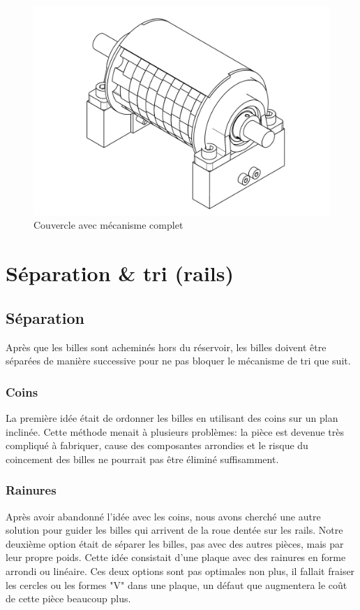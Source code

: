 \begin{figure}
    \centering
    \includegraphics[width=\textwidth]{Graphics/Roue/DRAWING_COUVERCLE_COMPLET.pdf}
    \caption{Couvercle avec mécanisme complet}
\end{figure}

\section{Séparation \& tri (rails)}

\subsection{Séparation}
Après que les billes sont acheminés hors du réservoir, les billes doivent être séparées de manière successive pour ne pas bloquer le mécanisme de tri que suit.

\subsubsection{Coins}
La première idée était de ordonner les billes en utilisant des coins sur un plan inclinée. Cette méthode menait à plusieurs problèmes: la pièce est devenue très compliqué à fabriquer, cause des composantes arrondies et le risque du coincement des billes ne pourrait pas être éliminé suffisamment.


\subsubsection{Rainures}
Après avoir abandonné l'idée avec les coins, nous avons cherché une autre solution pour guider les billes qui arrivent de la roue dentée sur les rails. Notre deuxième option était de séparer les billes, pas avec des autres pièces, mais par leur propre poids. Cette idée consistait d'une plaque avec des rainures en forme arrondi ou linéaire. Ces deux options sont pas optimales non plus, il fallait fraiser les cercles ou les formes "V" dans une plaque, un défaut que augmentera le coût de cette pièce beaucoup plus.

